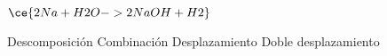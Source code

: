 $\ce{2Na + H2O -> 2NaOH + H2}$

\begin{choices}
    \choice Descomposición
    \choice Combinación
    \CorrectChoice Desplazamiento
    \choice Doble desplazamiento
\end{choices}